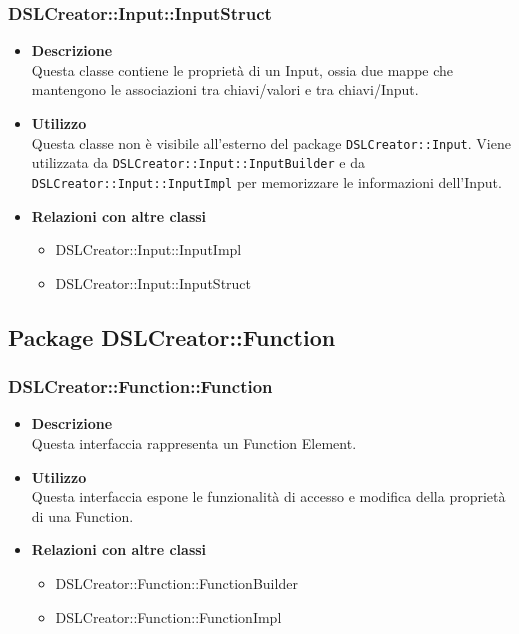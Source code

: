  \subsubsection{DSLCreator::Input::InputStruct}
                    \begin{itemize}
                        \item \textbf{Descrizione} \hfill \\
                          Questa classe contiene le proprietà di un Input, ossia due mappe che mantengono le associazioni tra chiavi/valori e tra chiavi/Input.
                        \item \textbf{Utilizzo} \hfill \\
                          Questa classe non è visibile all'esterno del package \texttt{DSLCreator::Input}. Viene utilizzata da \texttt{DSLCreator::Input::InputBuilder} e da \texttt{DSLCreator::Input::InputImpl} per memorizzare le informazioni dell'Input.
                        \item \textbf{Relazioni con altre classi}
                            \begin{itemize}
                              \item DSLCreator::Input::InputImpl
                              \item DSLCreator::Input::InputStruct
                            \end{itemize}
                    \end{itemize}  

\subsection{Package DSLCreator::Function}
 \subsubsection{DSLCreator::Function::Function}
                    \begin{itemize}
                        \item \textbf{Descrizione} \hfill \\
                          Questa interfaccia rappresenta un Function Element. 
                        \item \textbf{Utilizzo} \hfill \\
                          Questa interfaccia espone le funzionalità di accesso e modifica della proprietà di una Function.
                        \item \textbf{Relazioni con altre classi}
                            \begin{itemize}
                              \item DSLCreator::Function::FunctionBuilder
                              \item DSLCreator::Function::FunctionImpl
                            \end{itemize}
                    \end{itemize}  

